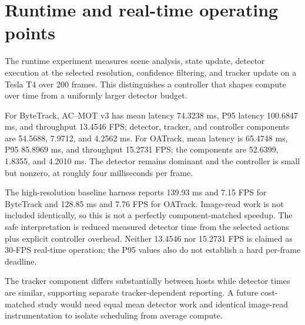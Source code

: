 \section{Runtime and real-time operating points}
The runtime experiment measures scene analysis, state update, detector execution
at the selected resolution, confidence filtering, and tracker update on a Tesla
T4 over 200 frames. This distinguishes a controller that shapes compute over
time from a uniformly larger detector budget.

For ByteTrack, AC--MOT v3 has mean latency 74.3238 ms, P95 latency 100.6847 ms, and
throughput 13.4546 FPS; detector, tracker, and controller components are
54.5688, 7.9712, and 4.2562 ms. For OATrack, mean latency is 65.4748 ms, P95
85.8969 ms, and throughput 15.2731 FPS; the components are 52.6399, 1.8355,
and 4.2010 ms. The detector remains dominant and the controller is small but
nonzero, at roughly four milliseconds per frame.

The high-resolution baseline harness reports 139.93 ms and 7.15 FPS for
ByteTrack and 128.85 ms and 7.76 FPS for OATrack. Image-read work is not
included identically, so this is not a perfectly component-matched speedup.
The safe interpretation is reduced measured detector time from the selected
actions plus explicit controller overhead. Neither 13.4546 nor 15.2731 FPS is
claimed as 30-FPS real-time operation; the P95 values also do not establish a
hard per-frame deadline.

The tracker component differs substantially between hosts while detector times
are similar, supporting separate tracker-dependent reporting. A future
cost-matched study would need equal mean detector work and identical image-read
instrumentation to isolate scheduling from average compute.
